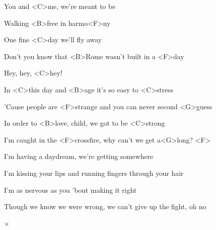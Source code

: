 

\zr
You and <C>me, we're meant to be

Walking <B>free in harmo<F>ny

One fine <C>day we'll fly away

Don't you know that <B>Rome wasn't built in a <F>day

Hey, hey, <C>hey!
\kr

\zs
In <C>this day and <B>age it's so easy to <C>stress

'Cause people are <F>strange and you can never second <G>guess

In order to <B>love, child, we got to be <C>strong

I'm caught in the <F>crossfire, why can't we get a<G>long? <F>
\ks

\zr\kr

\zs
I'm having a daydream, we're getting somewhere

I'm kissing your lips and running fingers through your hair

I'm as nervous as you 'bout making it right

Though we know we were wrong, we can't give up the fight, oh no
\ks

× \kr

\kp
